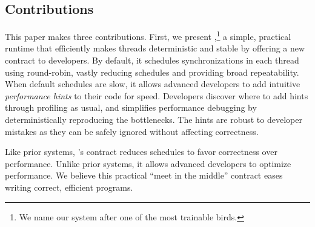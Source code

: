 


\subsection{Contributions}

This paper makes three contributions.
First, we present \parrot,\footnote{We name our system after one of the most
  trainable birds.} a simple, practical runtime that efficiently makes
threads deterministic and stable by offering a new contract to developers.
By default, it schedules synchronizations in each thread using
round-robin, vastly reducing schedules and providing broad repeatability.
When default schedules are slow, it allows advanced developers to add
intuitive \emph{performance hints} to their code for speed.  Developers discover
where to add hints through profiling as usual, and \parrot simplifies
performance debugging by deterministically reproducing the bottlenecks.
The hints are robust to developer mistakes as they can be safely ignored
without affecting correctness.

Like prior systems, \parrot's contract reduces schedules to favor correctness over performance.  Unlike prior systems, it allows advanced developers
to optimize performance.  We believe this practical ``meet in the
middle'' contract eases writing correct, efficient programs.


